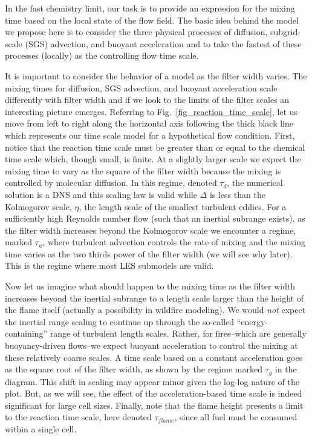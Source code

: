 In the fast chemistry limit, our task is to provide an expression for the mixing time based on the local state of the flow field.  The basic idea behind the model we propose here is to consider the three physical processes of diffusion, subgrid-scale (SGS) advection, and buoyant acceleration and to take the fastest of these processes (locally) as the controlling flow time scale.

It is important to consider the behavior of a model as the filter width varies. The mixing times for diffusion, SGS advection, and buoyant acceleration scale differently with filter width and if we look to the limits of the filter scales an interesting picture emerges.  Referring to Fig.~\ref{fig_reaction_time_scale}, let us move from left to right along the horizontal axis following the thick black line which represents our time scale model for a hypothetical flow condition.  First, notice that the reaction time scale must be greater than or equal to the chemical time scale which, though small, is finite. At a slightly larger scale we expect the mixing time to vary as the square of the filter width because the mixing is controlled by molecular diffusion.  In this regime, denoted $\tau_d$, the numerical solution is a DNS and this scaling law is valid while $\Delta$ is less than the Kolmogorov scale, $\eta$, the length scale of the smallest turbulent eddies. For a sufficiently high Reynolds number flow (such that an inertial subrange exists), as the filter width increases beyond the Kolmogorov scale we encounter a regime, marked $\tau_u$, where turbulent advection controls the rate of mixing and the mixing time varies as the two thirds power of the filter width \cite{Pope:2000} (we will see why later).  This is the regime where most LES submodels are valid.

Now let us imagine what should happen to the mixing time as the filter width increases beyond the inertial subrange to a length scale larger than the height of the flame itself (actually a possibility in wildfire modeling). We would \emph{not} expect the inertial range scaling to continue up through the so-called ``energy-containing'' range of turbulent length scales.  Rather, for fires--which are generally buoyancy-driven flows--we expect buoyant acceleration to control the mixing at these relatively coarse scales.  A time scale based on a constant acceleration goes as the square root of the filter width, as shown by the regime marked $\tau_g$ in the diagram.  This shift in scaling may appear minor given the log-log nature of the plot. But, as we will see, the effect of the acceleration-based time scale is indeed significant for large cell sizes.  Finally, note that the flame height presents a limit to the reaction time scale, here denoted $\tau_{flame}$, since all fuel must be consumed within a single cell.

